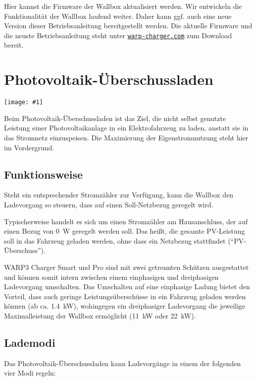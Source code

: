 \documentclass[a4paper,10pt]{article}
\newcommand{\gfx}[1]{\texttt{[image: \#1]}}
\newcommand\rurl[2]{%
  \href{#1}{\nolinkurl{#2}}%
}
\begin{document}
\begin{multicols*}{2}
    Hier kannst die Firmware der Wallbox aktualisiert werden. Wir entwickeln die Funktionalität
    der Wallbox laufend weiter. Daher kann ggf. auch eine neue
    Version dieser Betriebsanleitung bereitgestellt werden.
    Die aktuelle Firmware und die neuste Betriebsanleitung steht unter
    \rurl{https://warp-charger.com}{warp-charger.com} zum Download bereit.

    \newpage
	\section{Photovoltaik-Überschussladen}\label{pv_charge}
	\gfx{./img_warp3/resized/web_pv_excess_settings}

	Beim Photovoltaik-Überschussladen ist das Ziel, die nicht selbst genutzte Leistung einer
	Photovoltaikanlage in ein
	Elektrofahrzeug zu laden, anstatt sie in das Stromnetz einzuspeisen. Die Maximierung der Eigenstromnutzung steht hier
	im Vordergrund.

	\subsection{Funktionsweise}
	Steht ein entsprechender Stromzähler zur Verfügung, kann die Wallbox den
	Ladevorgang so steuern, dass auf einen Soll-Netzbezug geregelt wird.

	Typischerweise handelt es sich um einen Stromzähler am Hausanschluss, der auf
	einen Bezug von \SI{0}{\watt} geregelt werden soll. Das heißt, die gesamte
	PV-Leistung soll in das Fahrzeug geladen werden, ohne dass ein Netzbezug
	stattfindet (\enquote{PV-Überschuss}).

	WARP3 Charger Smart und Pro sind mit zwei getrennten Schützen
	ausgestattet und können somit intern zwischen einem einphasigen und dreiphasigen
	Ladevorgang umschalten. Das Umschalten auf eine einphasige Ladung bietet den Vorteil, dass auch geringe
	Leistungsüberschüsse in ein Fahrzeug geladen werden können (ab ca.
	\SI{1,4}{\kilo\watt}), wohingegen ein dreiphasiger Ladevorgang die jeweilige
	Maximalleistung der Wallbox ermöglicht (\SI{11}{\kilo\watt} oder
	\SI{22}{\kilo\watt}).

	\subsection{Lademodi}

	Das Photovoltaik-Überschussladen kann Ladevorgänge in einem der folgenden vier Modi regeln:


\end{multicols*}
\end{document}
